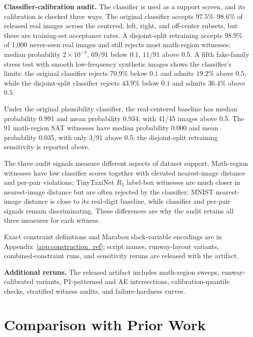 \documentclass[twocolumn,smallextended,runningheads]{svjour3}
\begin{document}
\textbf{Classifier-calibration audit.} The classifier is used as a support screen, and its calibration is checked three ways. The original classifier accepts $97.5\%$--$98.6\%$ of released real images across the centered, left, right, and off-center subsets, but these are training-set acceptance rates. A disjoint-split retraining accepts $98.9\%$ of 1{,}000 never-seen real images and still rejects most math-region witnesses: median probability $2\times 10^{-4}$, $69/91$ below $0.1$, $11/91$ above $0.5$. A fifth fake-family stress test with smooth low-frequency synthetic images shows the classifier's limits: the original classifier rejects $70.9\%$ below $0.1$ and admits $19.2\%$ above $0.5$, while the disjoint-split classifier rejects $43.9\%$ below $0.1$ and admits $36.4\%$ above $0.5$.

Under the original plausibility classifier, the real-centered baseline has median probability 0.991 and mean probability 0.934, with 41/45 images above 0.5. The 91 math-region SAT witnesses have median probability 0.000 and mean probability 0.035, with only 3/91 above 0.5; the disjoint-split retraining sensitivity is reported above.

The three audit signals measure different aspects of dataset support. Math-region witnesses have low classifier scores together with elevated nearest-image distance and per-pair violations; TinyTaxiNet $R_5$ label-box witnesses are much closer in nearest-image distance but are often rejected by the classifier; MNIST nearest-image distance is close to its real-digit baseline, while classifier and per-pair signals remain discriminating. These differences are why the audit retains all three measures for each witness.

Exact constraint definitions and Marabou slack-variable encodings are in Appendix~\ref{app:construction_ref}; script names, runway-layout variants, combined-constraint runs, and sensitivity reruns are released with the artifact.

\textbf{Additional reruns.} The released artifact includes math-region sweeps, runway-calibrated variants, P1-patterned and AE intersections, calibration-quantile checks, stratified witness audits, and failure-hardness curves.

\section{Comparison with Prior Work}
\label{sec:prior_work}
\end{document}
